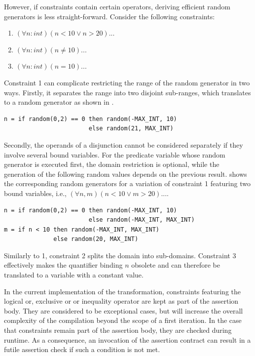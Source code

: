 However, if constraints contain certain operators, deriving efficient random generators is less straight-forward. Consider the following constraints:
\begin{enumerate}
\itemsep-0.7em
\item $(\forall n : int) (n < 10 \lor n > 20) ...$
\item $(\forall n : int) (n \ne 10) ...$
\item $(\forall n : int) (n = 10) ...$
\end{enumerate}
Constraint 1 can complicate restricting the range of the random generator in two ways. Firstly, it separates the range into two disjoint sub-ranges, which translates to a random generator as shown in .
\begin{lstlisting}[label=lst:rand_disjoint, caption=Random generator with two disjoint ranges, numbers=none]
n = if random(0,2) == 0 then random(-MAX_INT, 10)
                        else random(21, MAX_INT)
\end{lstlisting}
Secondly, the operands of a disjunction cannot be considered separately if they involve several bound variables. For the predicate variable whose random generator is executed first, the domain restriction is optional, while the generation of the following random values depends on the previous result.  shows the corresponding random generators for a variation of constraint 1 featuring two bound variables, i.e., $(\forall n,m) (n < 10 \lor m > 20)...$.
\begin{lstlisting}[label=lst:rand_disjoint_nm, caption=Random generators of a disjunction of constraints on two bound variables, numbers=none]
n = if random(0,2) == 0 then random(-MAX_INT, 10)
                        else random(-MAX_INT, MAX_INT)
m = if n < 10 then random(-MAX_INT, MAX_INT)
              else random(20, MAX_INT)
\end{lstlisting}
Similarly to 1, constraint 2 splits the domain into sub-domains. Constraint 3 effectively makes the quantifier binding $n$ obsolete and can therefore be translated to a variable with a constant value.

In the current implementation of the transformation, constraints featuring the logical or, exclusive or or inequality operator are kept as part of the assertion body. They are considered to be exceptional cases, but will increase the overall complexity of the compilation beyond the scope of a first iteration. In the case that constraints remain part of the assertion body, they are checked during runtime. As a consequence, an invocation of the assertion contract can result in a futile assertion check if such a condition is not met.


